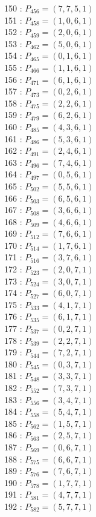 \documentclass{article}
\begin{document}
{\begin{multicols}{3}
150 : $P_{456}=( 7, 7, 5, 1 )$\\
151 : $P_{458}=( 1, 0, 6, 1 )$\\
152 : $P_{459}=( 2, 0, 6, 1 )$\\
153 : $P_{462}=( 5, 0, 6, 1 )$\\
154 : $P_{465}=( 0, 1, 6, 1 )$\\
155 : $P_{466}=( 1, 1, 6, 1 )$\\
156 : $P_{471}=( 6, 1, 6, 1 )$\\
157 : $P_{473}=( 0, 2, 6, 1 )$\\
158 : $P_{475}=( 2, 2, 6, 1 )$\\
159 : $P_{479}=( 6, 2, 6, 1 )$\\
160 : $P_{485}=( 4, 3, 6, 1 )$\\
161 : $P_{486}=( 5, 3, 6, 1 )$\\
162 : $P_{491}=( 2, 4, 6, 1 )$\\
163 : $P_{496}=( 7, 4, 6, 1 )$\\
164 : $P_{497}=( 0, 5, 6, 1 )$\\
165 : $P_{502}=( 5, 5, 6, 1 )$\\
166 : $P_{503}=( 6, 5, 6, 1 )$\\
167 : $P_{508}=( 3, 6, 6, 1 )$\\
168 : $P_{509}=( 4, 6, 6, 1 )$\\
169 : $P_{512}=( 7, 6, 6, 1 )$\\
170 : $P_{514}=( 1, 7, 6, 1 )$\\
171 : $P_{516}=( 3, 7, 6, 1 )$\\
172 : $P_{523}=( 2, 0, 7, 1 )$\\
173 : $P_{524}=( 3, 0, 7, 1 )$\\
174 : $P_{527}=( 6, 0, 7, 1 )$\\
175 : $P_{533}=( 4, 1, 7, 1 )$\\
176 : $P_{535}=( 6, 1, 7, 1 )$\\
177 : $P_{537}=( 0, 2, 7, 1 )$\\
178 : $P_{539}=( 2, 2, 7, 1 )$\\
179 : $P_{544}=( 7, 2, 7, 1 )$\\
180 : $P_{545}=( 0, 3, 7, 1 )$\\
181 : $P_{548}=( 3, 3, 7, 1 )$\\
182 : $P_{552}=( 7, 3, 7, 1 )$\\
183 : $P_{556}=( 3, 4, 7, 1 )$\\
184 : $P_{558}=( 5, 4, 7, 1 )$\\
185 : $P_{562}=( 1, 5, 7, 1 )$\\
186 : $P_{563}=( 2, 5, 7, 1 )$\\
187 : $P_{569}=( 0, 6, 7, 1 )$\\
188 : $P_{575}=( 6, 6, 7, 1 )$\\
189 : $P_{576}=( 7, 6, 7, 1 )$\\
190 : $P_{578}=( 1, 7, 7, 1 )$\\
191 : $P_{581}=( 4, 7, 7, 1 )$\\
192 : $P_{582}=( 5, 7, 7, 1 )$\\
\end{multicols}


}
\end{document}
